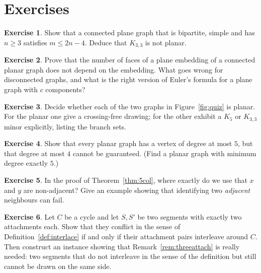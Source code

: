 \documentclass[11pt,a4paper]{article}
\theoremstyle{plain}
\theoremstyle{definition}
\newtheorem{exercise}{Exercise}
\theoremstyle{remark}
\begin{document}
\section{Exercises}

\begin{exercise}
Show that a connected plane graph that is bipartite, simple and has $n \ge 3$
satisfies $m \le 2n - 4$. Deduce that $K_{3,3}$ is not planar.
\end{exercise}

\begin{exercise}
Prove that the number of faces of a plane embedding of a connected planar graph
does not depend on the embedding. What goes wrong for disconnected graphs, and
what is the right version of Euler's formula for a plane graph with $c$
components?
\end{exercise}

\begin{exercise}
Decide whether each of the two graphs in Figure~\ref{fig:quiz} is planar. For
the planar one give a crossing-free drawing; for the other exhibit a $K_5$ or
$K_{3,3}$ minor explicitly, listing the branch sets.
\end{exercise}

\begin{exercise}
Show that every planar graph has a vertex of degree at most $5$, but that
degree at most $4$ cannot be guaranteed. (Find a planar graph with minimum
degree exactly $5$.)
\end{exercise}

\begin{exercise}
In the proof of Theorem~\ref{thm:5col}, where exactly do we use that $x$ and
$y$ are non-adjacent? Give an example showing that identifying two
\emph{adjacent} neighbours can fail.
\end{exercise}

\begin{exercise}
Let $C$ be a cycle and let $S, S'$ be two segments with exactly two attachments
each. Show that they conflict in the sense of
Definition~\ref{def:interlace} if and only if their attachment pairs
interleave around $C$. Then construct an instance showing that
Remark~\ref{rem:threeattach} is really needed: two segments that do not
interleave in the sense of the definition but still cannot be drawn on the same
side.
\end{exercise}
\end{document}
